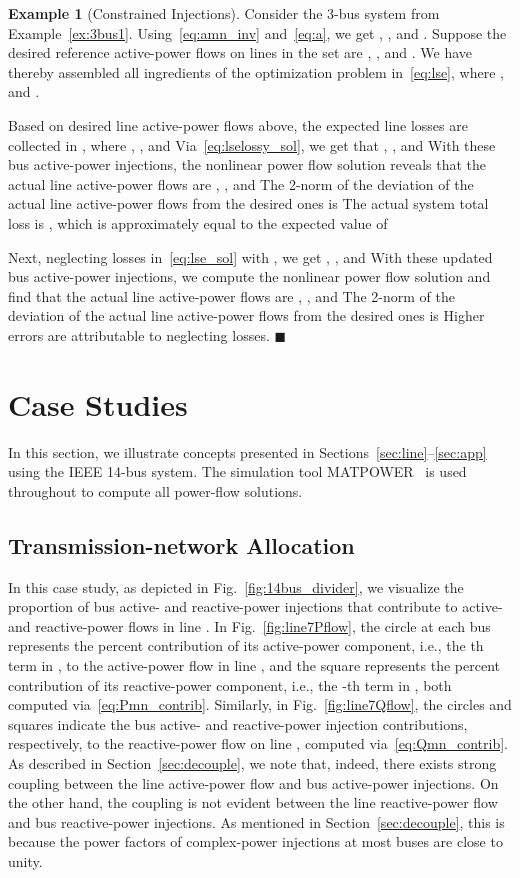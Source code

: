 \documentclass[journal]{IEEEtran}
\theoremstyle{definition}
\newtheorem{example}{Example}
\newcommand{\qedblack}{\hfill \ensuremath{\blacksquare}}
\begin{document}
\begin{example}[Constrained Injections]
\label{ex:3bus5}
Consider the 3-bus system from Example~\ref{ex:3bus1}.  Using~\eqref{eq:amn_inv} and~\eqref{eq:a}, we get , , and .  Suppose the desired reference active-power flows on lines in the set  are , , and  .   We have thereby assembled all ingredients of the optimization problem in~\eqref{eq:lse}, where , and .

Based on desired line active-power flows above, the expected line losses are collected in , where , , and   Via~\eqref{eq:lselossy_sol}, we get that , , and   With these bus active-power injections, the nonlinear power flow solution reveals that the actual line active-power flows are , , and   
The 2-norm of the deviation of the actual line active-power flows from the desired ones is   
The actual system total loss is , which is approximately equal to the expected value of 

Next, neglecting losses in~\eqref{eq:lse_sol} with , we get , , and   With these updated bus active-power injections, we compute the nonlinear power flow solution and find that the actual line active-power flows are , , and   The 2-norm of the deviation of the actual line active-power flows from the desired ones is   Higher errors are attributable to neglecting losses. \qedblack
\end{example}

\section{Case Studies} \label{sec:cases}
In this section, we illustrate concepts presented in Sections~\ref{sec:line}--\ref{sec:app} using the IEEE 14-bus system.  The simulation tool MATPOWER~\cite{Zimmerman:2011} is used throughout to compute  all power-flow solutions.

\subsection{Transmission-network Allocation}
In this case study, as depicted in Fig.~\ref{fig:14bus_divider}, we visualize the proportion of bus active- and  reactive-power injections that contribute to active- and reactive-power flows in line .  In Fig.~\ref{fig:line7Pflow}, the circle at each bus  represents the percent contribution of its active-power component, i.e., the th term in , to the active-power flow in line , and the square represents the percent contribution of its reactive-power component, i.e., the -th term in , both computed via~\eqref{eq:Pmn_contrib}.  Similarly, in Fig.~\ref{fig:line7Qflow}, the circles and squares indicate the bus active- and reactive-power injection contributions, respectively, to the reactive-power flow on line , computed via~\eqref{eq:Qmn_contrib}.  As described in Section~\ref{sec:decouple}, we note that, indeed, there exists strong coupling between the line active-power flow and bus active-power injections.  On the other hand, the coupling is not evident between the line reactive-power flow and bus reactive-power injections.  As mentioned in Section~\ref{sec:decouple}, this is because the power factors of complex-power injections  at most buses are close to unity.
\end{document}
